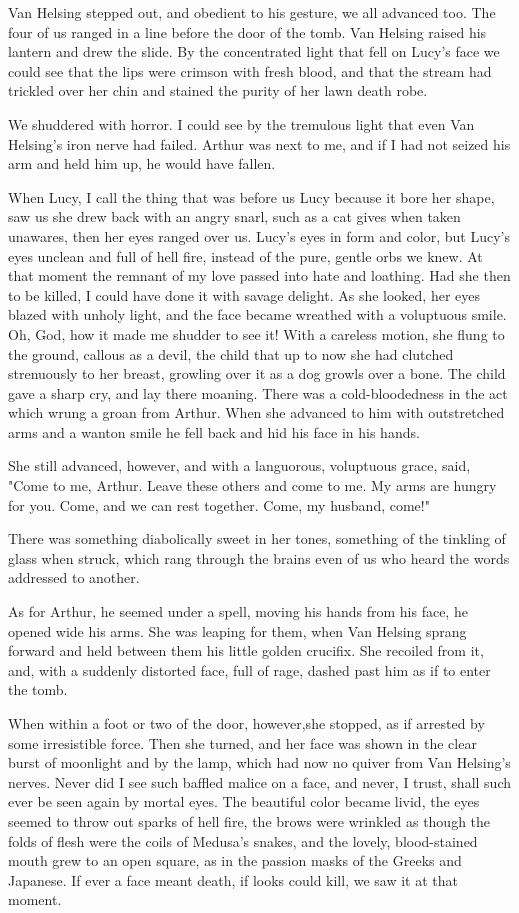 Van Helsing stepped out, and obedient to his gesture, we all advanced too. The four of us ranged in a line before the door of the tomb. Van Helsing raised his lantern and drew the slide. By the concentrated light that fell on Lucy's face we could see that the lips were crimson with fresh blood, and that the stream had trickled over her chin and stained the purity of her lawn death robe. 

We shuddered with horror. I could see by the tremulous light that even Van Helsing's iron nerve had failed. Arthur was next to me, and if I had not seized his arm and held him up, he would have fallen. 

When Lucy, I call the thing that was before us Lucy because it bore her shape, saw us she drew back with an angry snarl, such as a cat gives when taken unawares, then her eyes ranged over us. Lucy's eyes in form and color, but Lucy's eyes unclean and full of hell fire, instead of the pure, gentle orbs we knew. At that moment the remnant of my love passed into hate and loathing. Had she then to be killed, I could have done it with savage delight. As she looked, her eyes blazed with unholy light, and the face became wreathed with a voluptuous smile. Oh, God, how it made me shudder to see it! With a careless motion, she flung to the ground, callous as a devil, the child that up to now she had clutched strenuously to her breast, growling over it as a dog growls over a bone. The child gave a sharp cry, and lay there moaning. There was a cold-bloodedness in the act which wrung a groan from Arthur. When she advanced to him with outstretched arms and a wanton smile he fell back and hid his face in his hands. 

She still advanced, however, and with a languorous, voluptuous grace, said, "Come to me, Arthur. Leave these others and come to me. My arms are hungry for you. Come, and we can rest together. Come, my husband, come!" 

There was something diabolically sweet in her tones, something of the tinkling of glass when struck, which rang through the brains even of us who heard the words addressed to another. 

As for Arthur, he seemed under a spell, moving his hands from his face, he opened wide his arms. She was leaping for them, when Van Helsing sprang forward and held between them his little golden crucifix. She recoiled from it, and, with a suddenly distorted face, full of rage, dashed past him as if to enter the tomb. 

When within a foot or two of the door, however,she stopped, as if arrested by some irresistible force. Then she turned, and her face was shown in the clear burst of moonlight and by the lamp, which had now no quiver from Van Helsing's nerves. Never did I see such baffled malice on a face, and never, I trust, shall such ever be seen again by mortal eyes. The beautiful color became livid, the eyes seemed to throw out sparks of hell fire, the brows were wrinkled as though the folds of flesh were the coils of Medusa's snakes, and the lovely, blood-stained mouth grew to an open square, as in the passion masks of the Greeks and Japanese. If ever a face meant death, if looks could kill, we saw it at that moment. 

